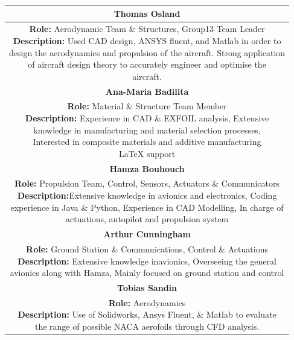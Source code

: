 \documentclass[12pt]{article}
\begin{document}
\setlength\arrayrulewidth{0.7pt}
\begin{table}[!htpb]
    \begin{tabular}{ |c| }
        \hline
        \textbf{Thomas Osland}\\
        \hline
        \makecell[tl]{\textbf{Role:} Aerodynamic Team \& Structures, Group13 Team Leader\\ \textbf{Description:} Used CAD design, ANSYS fluent, and Matlab in order to \\
         design the aerodynamics and propulsion of the aircraft. Strong application \\ of aircraft design theory to accurately engineer and optimise the \\ aircraft.}\\
        \hline
        \textbf{Ana-Maria Badilita} \\
        \hline
        \makecell[tl]{\textbf{Role:} Material \& Structure Team Member \\ \textbf{Description:} Experience in CAD \& EXFOIL analysis, Extensive \\ knowledge in manufacturing and material selection processes, \\ Interested in composite materials and additive manufacturing \\ LaTeX support} \\
        \hline
        \textbf{Hamza Bouhouch} \\
        \hline
        \makecell[tl]{\textbf{Role:} Propulsion Team, Control, Sensors, Actuators \& Communicators \\ \textbf{Description:}Extensive knowledge in avionics and electronics, Coding \\ experience in Java \& Python, Experience in CAD Modelling, In charge of \\ actuations, autopilot and propulsion system } \\
        \hline
        \textbf{Arthur Cunningham} \\
        \hline
        \makecell[tl]{\textbf{Role:} Ground Station \& Communications, Control \& Actuations \\ \textbf{Description:} Extensive knowledge inavionics, Overseeing the general \\ avionics along with Hamza, Mainly focused on ground station and control} \\
        \hline
        \textbf{Tobias Sandin} \\\hline
        \makecell[tl]{\textbf{Role:} Aerodynamics \\ \textbf{Description:} Use of Solidworks, Ansys Fluent, \& Matlab to evaluate\\ the range of possible NACA aerofoils through CFD analysis.}\\

\end{tabular}
\end{table}
\end{document}
